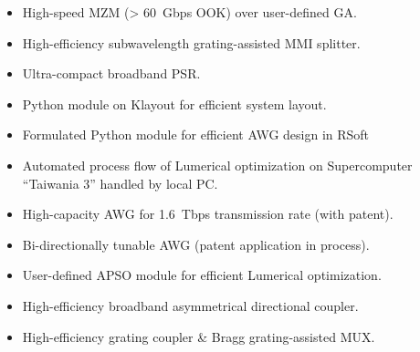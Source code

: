\begin{itemize}
\justifying 
\item {\normalsize High-speed MZM (> 60~Gbps OOK) over user-defined GA.}
\item {\normalsize High-efficiency subwavelength grating-assisted MMI splitter.}
\item {\normalsize Ultra-compact broadband PSR.}
\item {\normalsize Python module on Klayout for efficient system layout.}
\item {\normalsize Formulated Python module for efficient AWG design in RSoft}
\item {\normalsize Automated process flow of Lumerical optimization on Supercomputer ``Taiwania 3'' handled by local PC.}
\item {\normalsize High-capacity AWG for 1.6~Tbps transmission rate (with patent).}
\item {\normalsize Bi-directionally tunable AWG (patent application in process).}
\item {\normalsize User-defined APSO module for efficient Lumerical optimization.}
\item {\normalsize High-efficiency broadband asymmetrical directional coupler.}
\item {\normalsize High-efficiency grating coupler \& Bragg grating-assisted MUX.}
\end{itemize}


